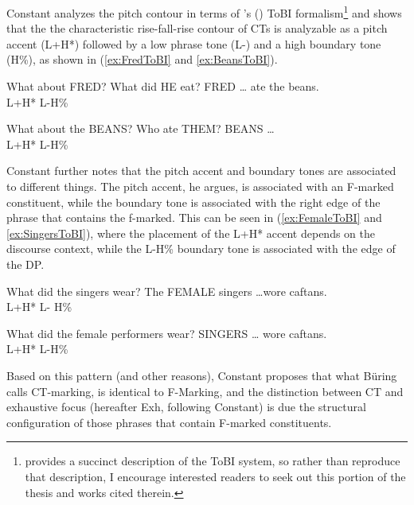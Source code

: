 \documentclass[
	letterpaper,
]{article}
\begin{document}
Constant analyzes the pitch contour in terms of \citeauthor{pierrehumbert1990meaning}'s (\citeyear{pierrehumbert1990meaning}) ToBI formalism\footnote{\textcite[14--16]{constant2014diss} provides a succinct description of the ToBI system, so rather than reproduce that description, I encourage interested readers to seek out this portion of the thesis and works cited therein.} and shows that the the characteristic rise-fall-rise contour of CTs is analyzable as a pitch accent (L+H*) followed by a low phrase tone (L-) and a high boundary tone (H\%), as shown in (\ref{ex:FredToBI} and \ref{ex:BeansToBI}).
\begin{exe}
\ex\label{ex:FredToBI}
\begin{xlist}
	 What about FRED? What did HE eat?
	\gll FRED {\ldots} {ate the beans.}\\
	L+H* L-H\% {}\\
\end{xlist}
\ex\label{ex:BeansToBI}
\begin{xlist}
 What about the BEANS? Who ate THEM?
 BEANS \ldots\\
{} L+H* L-H\%\\	
\end{xlist}	
\end{exe}

Constant further notes that the pitch accent and boundary tones are associated to different things.
The pitch accent, he argues, is associated with an F-marked constituent, while the boundary tone is associated with the right edge of the phrase that contains the f-marked.
This can be seen in (\ref{ex:FemaleToBI} and \ref{ex:SingersToBI}), where the placement of the L+H* accent depends on the discourse context, while the L-H\% boundary tone is associated with the edge of the DP.
\begin{exe}
\ex\label{ex:FemaleToBI}
\begin{xlist}
	 What did the singers wear?
	\gll The {\hspace{1em}FEMALE} singers \ldots {wore caftans.}\\
	{} L+H* {\hspace{2em}L-} H\% {}\\
\end{xlist}
\ex\label{ex:SingersToBI}
\begin{xlist}
	 What did the female performers wear?
	 {\hspace{1em}SINGERS} {\hspace{1em}\ldots} {wore caftans.}\\
	{} L+H* L-H\% {}\\	
\end{xlist}	
\end{exe}
Based on this pattern (and other reasons), Constant proposes that what B\"uring calls CT-marking, is identical to F-Marking, and the distinction between CT and exhaustive focus (hereafter Exh, following Constant) is due the structural configuration of those phrases that contain F-marked constituents.
\end{document}
